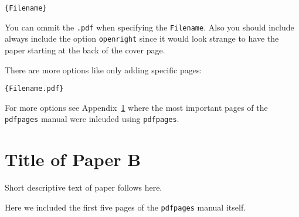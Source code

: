 \documentclass[%
]{USN-MSc}
\begin{document}
\begin{verbatim}
{Filename}
\end{verbatim}

You can ommit the \texttt{.pdf} when specifying the \texttt{Filename}. Also you should include always include the option \texttt{openright} since it would look strange to have the paper starting at the back of the cover page.

There are more options like only adding specific pages:
\begin{verbatim}
{Filename.pdf}
\end{verbatim}

For more options see Appendix~\ref{paper-b} where the most important pages of the \texttt{pdfpages} manual were inlcuded using \texttt{pdfpages}.




\chapter[Short Title of Paper B]{Title of Paper B}
\label{paper-b}
Short descriptive text of paper follows here.

Here we included the first five pages of the \texttt{pdfpages} manual itself.


\end{document}
